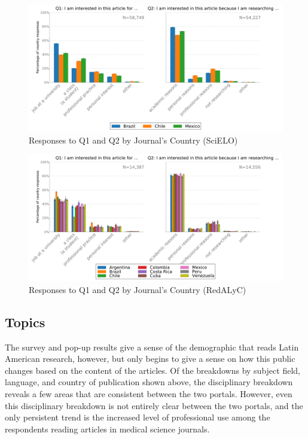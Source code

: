\begin{figure}[htbp]
\centering
\includegraphics[keepaspectratio,width=\textwidth,height=0.75\textheight]{figures/scielo_q1_q2_by_country_journal.pdf}
\caption{Responses to Q1 and Q2 by Journal's Country (SciELO)}
\label{scielo_q1_q2_by_country_journal}
\end{figure}

\begin{figure}[htbp]
\centering
\includegraphics[keepaspectratio,width=\textwidth,height=0.75\textheight]{figures/redalyc_q1_q2_by_country_journal.pdf}
\caption{Responses to Q1 and Q2 by Journal's Country (RedALyC)}
\label{redalyc_q1_q2_by_country_journal}
\end{figure}

\subsection{Topics}
\label{topics}

The survey and pop-up results give a sense of the demographic that reads Latin American research, however, but only begins to give a sense on how this public changes based on the content of the articles. Of the breakdowns by subject field, language, and country of publication shown above, the disciplinary breakdown reveals a few areas that are consistent between the two portals. However, even this disciplinary breakdown is not entirely clear between the two portals, and the only persistent trend is the increased level of professional use among the respondents reading articles in medical science journals.

